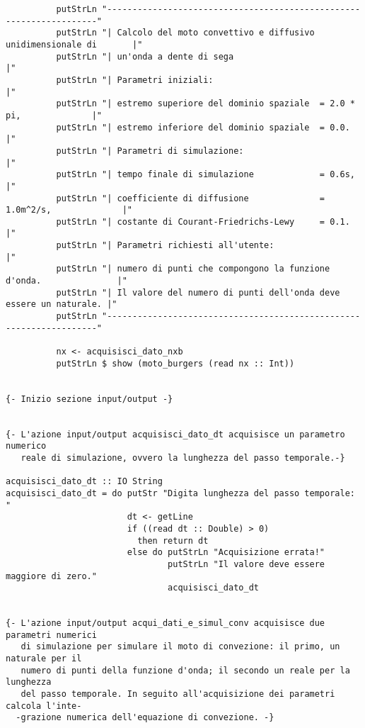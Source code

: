 \begin{verbatim}
          putStrLn "--------------------------------------------------------------------"
          putStrLn "| Calcolo del moto convettivo e diffusivo unidimensionale di       |"
          putStrLn "| un'onda a dente di sega                                          |"
          putStrLn "| Parametri iniziali:                                              |"
          putStrLn "| estremo superiore del dominio spaziale  = 2.0 * pi,              |"
          putStrLn "| estremo inferiore del dominio spaziale  = 0.0.                   |" 
          putStrLn "| Parametri di simulazione:                                        |"
          putStrLn "| tempo finale di simulazione             = 0.6s,                  |" 
          putStrLn "| coefficiente di diffusione              = 1.0m^2/s,              |" 
          putStrLn "| costante di Courant-Friedrichs-Lewy     = 0.1.                   |" 
          putStrLn "| Parametri richiesti all'utente:                                  |" 
          putStrLn "| numero di punti che compongono la funzione d'onda.               |"
          putStrLn "| Il valore del numero di punti dell'onda deve essere un naturale. |"
          putStrLn "--------------------------------------------------------------------"

          nx <- acquisisci_dato_nxb 
          putStrLn $ show (moto_burgers (read nx :: Int))


{- Inizio sezione input/output -}


{- L'azione input/output acquisisci_dato_dt acquisisce un parametro numerico
   reale di simulazione, ovvero la lunghezza del passo temporale.-}

acquisisci_dato_dt :: IO String
acquisisci_dato_dt = do putStr "Digita lunghezza del passo temporale: "
                        dt <- getLine
                        if ((read dt :: Double) > 0)
                          then return dt
                        else do putStrLn "Acquisizione errata!"
                                putStrLn "Il valore deve essere maggiore di zero."
                                acquisisci_dato_dt 


{- L'azione input/output acqui_dati_e_simul_conv acquisisce due parametri numerici
   di simulazione per simulare il moto di convezione: il primo, un naturale per il 
   numero di punti della funzione d'onda; il secondo un reale per la lunghezza
   del passo temporale. In seguito all'acquisizione dei parametri calcola l'inte- 
  -grazione numerica dell'equazione di convezione. -}


\end{verbatim}

